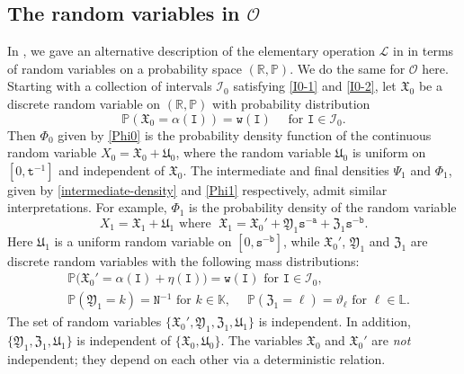 \documentclass[12pt, twoside]{article}
\theoremstyle{definition}
\numberwithin{equation}{section}
\begin{document}
\subsection{The random variables in $\mathscr{O}$} \label{random-variables-section} 
 In \cite{PZ-1}, we gave an alternative description of the elementary operation $\mathscr{L}$ in \cite{l86} in terms of random variables on a probability space $(\mathbb R, \mathbb P)$. We do the same for $\mathscr{O}$ here. 
\vskip0.1in 
\noindent Starting with a collection of intervals $\mathscr{I}_0$ satisfying \eqref{I0-1} and \eqref{I0-2}, let $\mathfrak X_0$ be a discrete random variable on $(\mathbb R, \mathbb P)$ with probability distribution  
\[ \mathbb P \left(\mathfrak X_0 = \alpha(\mathtt I) \right) = \mathtt w(\mathtt I) \quad \text{ for } \mathtt I \in \mathscr{I}_0. \]   
Then $\Phi_0$ given by \eqref{Phi0} is the probability density function of the continuous random variable $X_0 = \mathfrak X_0 + \mathfrak U_0$, where the random variable $\mathfrak U_0$ is uniform on $[0, \mathtt t^{-1}]$ and independent of $\mathfrak X_0$. The intermediate and final densities $\Psi_1$ and $\Phi_1$, given by \eqref{intermediate-density} and \eqref{Phi1} respectively, admit similar interpretations. For example, $\Phi_1$
is the probability density of the random variable
\[ X_1 = \mathfrak X_1 + \mathfrak U_1 \text{ where } \; \mathfrak X_1 = \mathfrak X_0' + \mathfrak Y_1 \mathtt s^{-\mathtt a} + \mathfrak Z_1 \mathtt s^{-\mathtt b}.  \] 
Here  $\mathfrak U_1$ is a uniform random variable on $[0, \mathtt s^{-\mathtt b}]$, while $\mathfrak X_0'$, $\mathfrak Y_1$ and $ \mathfrak Z_1$ are discrete random variables with the following mass distributions:
\begin{align*} 
&\mathbb P\bigl(\mathfrak X_0' = \alpha(\mathtt I) + \eta(\mathtt I) \bigr) = \mathtt w(\mathtt I) \text{ for } \mathtt I \in \mathscr{I}_0,  \\ 
&\mathbb P \left(\mathfrak Y_1 = k \right) = {\mathtt N}^{-1} \text{ for } k \in \mathbb K, \quad \; \mathbb P \left(\mathfrak Z_1 = \ell \right) = \vartheta_{\ell} \text{ for } \ell \in \mathbb L. 
\end{align*} 
The set of random variables $\{\mathfrak X_0', \mathfrak Y_1, \mathfrak Z_1, \mathfrak U_1\}$ is independent. In addition, $\{\mathfrak Y_1, \mathfrak Z_1, \mathfrak U_1\}$ is independent of $\{\mathfrak X_0, \mathfrak U_0\}$. The variables $\mathfrak X_0$ and $\mathfrak X_0'$ are {\em{not}} independent; they depend on each other via a deterministic relation.
\end{document}
